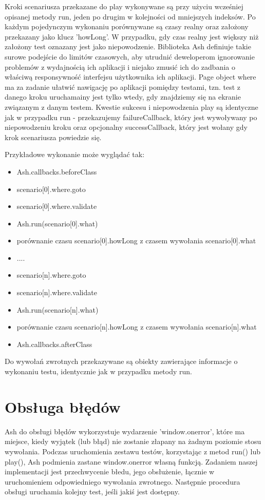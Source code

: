 \documentclass[brudnopis]{xmgr}
\begin{document}
Kroki scenariusza przekazane do play wykonywane są przy użyciu wcześniej opisanej metody run, jeden po drugim w kolejności od mniejszych indeksów. Po każdym pojedynczym wykonaniu porównywane są czasy realny oraz założony przekazany jako klucz 'howLong'. W przypadku, gdy czas realny jest większy niż założony test oznazany jest jako niepowodzenie. Biblioteka Ash definiuje takie surowe podejście do limitów czasowych, aby utrudnić deweloperom ignorowanie problemów z wydajnością ich aplikacji i niejako zmusić ich do zadbania o właściwą responsywność interfejsu użytkownika ich aplikacji. Page object where ma za zadanie ułatwić nawigację po aplikacji pomiędzy testami, tzn. test z danego kroku uruchamainy jest tylko wtedy, gdy znajdziemy się na ekranie związanym z danym testem. Kwestie sukcesu i niepowodzenia play są identyczne jak w przypadku run - przekazujemy failureCallback, który jest wywoływany po niepowodzeniu kroku oraz opcjonalny successCallback,  który jest wołany gdy krok scenariusza powiedzie się. 

Przykładowe wykonanie może wyglądać tak:

\begin{itemize}
  \item Ash.callbacks.beforeClass
  \item scenario[0].where.goto
  \item scenario[0].where.validate
  \item Ash.run(scenario[0].what)
  \item porównanie czasu scenario[0].howLong z czasem wywołania scenario[0].what
  \item ....
  \item scenario[n].where.goto
  \item scenario[n].where.validate
  \item Ash.run(scenario[n].what)
  \item porównanie czasu scenario[n].howLong z czasem wywołania scenario[n].what
  \item Ash.callbacks.afterClass
\end{itemize}

Do wywołań zwrotnych przekazywane są obiekty zawierające informacje o wykonaniu testu, identycznie jak w przypadku metody run.

\section{Obsługa błędów}

Ash do obsługi błędów wykorzystuje wydarzenie 'window.onerror', które ma miejsce, kiedy wyjątek (lub błąd) nie zostanie złapany na żadnym poziomie stosu wywołania. Podczas uruchomienia zestawu testów, korzystając z metod run() lub play(), Ash podmienia zastane window.onerror własną funkcją. Zadaniem naszej implementacji jest przechwycenie błedu, jego obsłużenie, łącznie w uruchomieniem odpowiedniego wywołania zwrotnego. Następnie procedura obsługi uruchamia kolejny test, jeśli jakiś jest dostępny. 
\end{document}

